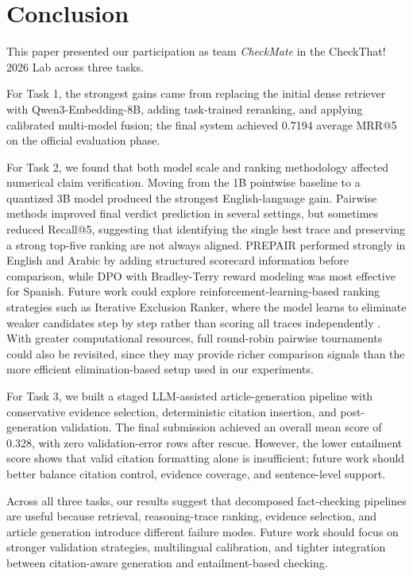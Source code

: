 \documentclass[
]{ceurart}
\begin{document}
\section{Conclusion}

This paper presented our participation as team \textit{CheckMate} in the CheckThat! 2026 Lab across three tasks.

For Task 1, the strongest gains came from replacing the initial dense retriever with Qwen3-Embedding-8B, adding task-trained reranking, and applying calibrated multi-model fusion; the final system achieved 0.7194 average MRR@5 on the official evaluation phase.

For Task 2, we found that both model scale and ranking methodology affected numerical claim verification. Moving from the 1B pointwise baseline to a quantized 3B model produced the strongest English-language gain. Pairwise methods improved final verdict prediction in several settings, but sometimes reduced Recall@5, suggesting that identifying the single best trace and preserving a strong top-five ranking are not always aligned. PREPAIR performed strongly in English and Arabic by adding structured scorecard information before comparison, while DPO with Bradley-Terry reward modeling was most effective for Spanish. Future work could explore reinforcement-learning-based ranking strategies such as Iterative Exclusion Ranker, where the model learns to eliminate weaker candidates step by step rather than scoring all traces independently \cite{IRRanker}. With greater computational resources, full round-robin pairwise tournaments could also be revisited, since they may provide richer comparison signals than the more efficient elimination-based setup used in our experiments.

For Task 3, we built a staged LLM-assisted article-generation pipeline with conservative evidence selection, deterministic citation insertion, and post-generation validation. The final submission achieved an overall mean score of 0.328, with zero validation-error rows after rescue. However, the lower entailment score shows that valid citation formatting alone is insufficient; future work should better balance citation control, evidence coverage, and sentence-level support.

Across all three tasks, our results suggest that decomposed fact-checking pipelines are useful because retrieval, reasoning-trace ranking, evidence selection, and article generation introduce different failure modes. Future work should focus on stronger validation strategies, multilingual calibration, and tighter integration between citation-aware generation and entailment-based checking.
\end{document}
